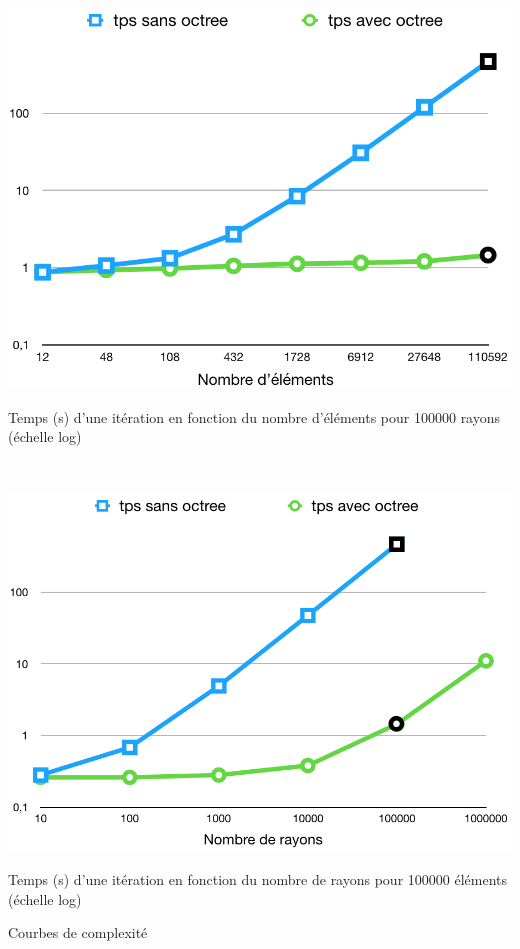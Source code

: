 \begin{figureth}
	\begin{subfigureth}{0.7\textwidth}
		\includegraphics[width=\linewidth]{images/complexite1}
		\caption{Temps (s) d'une itération en fonction du nombre d'éléments pour 100000 rayons (échelle log)}
		\label{complexite1}
	\end{subfigureth} \\
\bigskip
	\begin{subfigureth}{0.7\textwidth}
		\includegraphics[width=\linewidth]{images/complexite2}
		\caption{Temps (s) d'une itération en fonction du nombre de rayons pour 100000 éléments (échelle log)}
		\label{complexite2}
	\end{subfigureth}
	\caption{Courbes de complexité}
\end{figureth}


